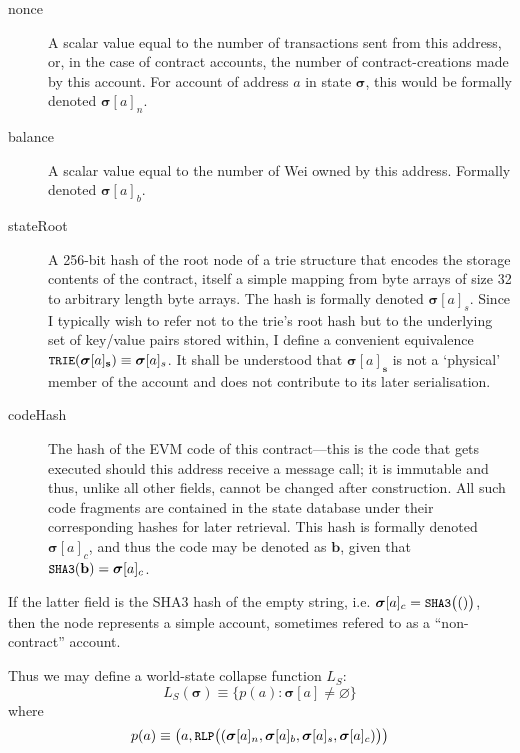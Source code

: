 \documentclass[9pt,oneside]{amsart}
\begin{document}
\begin{multicols}{2}
\begin{description}
\item[nonce] A scalar value equal to the number of transactions sent from this address, or, in the case of contract accounts, the number of contract-creations made by this account. For account of address $a$ in state $\boldsymbol{\sigma}$, this would be formally denoted $\boldsymbol{\sigma}[a]_n$.
\item[balance] A scalar value equal to the number of Wei owned by this address. Formally denoted $\boldsymbol{\sigma}[a]_b$.
\item[stateRoot] A 256-bit hash of the root node of a trie structure that encodes the storage contents of the contract, itself a simple mapping from byte arrays of size 32 to arbitrary length byte arrays. The hash is formally denoted $\boldsymbol{\sigma}[a]_s$. Since I typically wish to refer not to the trie's root hash but to the underlying set of key/value pairs stored within, I define a convenient equivalence $\texttt{\small TRIE}(\boldsymbol{\sigma}[a]_\mathbf{s}) \equiv \boldsymbol{\sigma}[a]_s$. It shall be understood that $\boldsymbol{\sigma}[a]_\mathbf{s}$ is not a `physical' member of the account and does not contribute to its later serialisation.
\item[codeHash] The hash of the EVM code of this contract---this is the code that gets executed should this address receive a message call; it is immutable and thus, unlike all other fields, cannot be changed after construction. All such code fragments are contained in the state database under their corresponding hashes for later retrieval. This hash is formally denoted $\boldsymbol{\sigma}[a]_c$, and thus the code may be denoted as $\mathbf{b}$, given that $\texttt{\small SHA3}(\mathbf{b}) = \boldsymbol{\sigma}[a]_c$.
\end{description}

If the latter field is the SHA3 hash of the empty string, i.e. $\boldsymbol{\sigma}[a]_c = \texttt{\small SHA3}\big(()\big)$, then the node represents a simple account, sometimes refered to as a ``non-contract'' account.

Thus we may define a world-state collapse function $L_S$:
\begin{equation}
L_S(\boldsymbol{\sigma}) \equiv \{ p(a): \boldsymbol{\sigma}[a] \neq \varnothing \}
\end{equation}
where
\begin{equation}
p(a) \equiv  \big(a, \texttt{\small RLP}\big( (\boldsymbol{\sigma}[a]_n, \boldsymbol{\sigma}[a]_b, \boldsymbol{\sigma}[a]_s, \boldsymbol{\sigma}[a]_c) \big) \big)
\end{equation}


\end{multicols}
\end{document}
